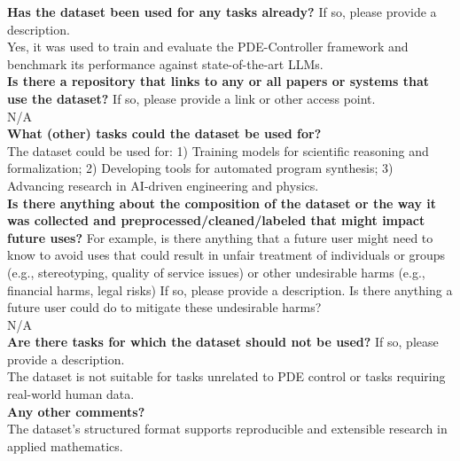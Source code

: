     \textcolor{\sectioncolor}{\textbf{Has the dataset been used for any tasks already?
    }
    If so, please provide a description.
    } \\
    Yes, it was used to train and evaluate the PDE-Controller framework and benchmark its performance against state-of-the-art LLMs. \\

    \textcolor{\sectioncolor}{\textbf{Is there a repository that links to any or all papers or systems that use the dataset?
    }
    If so, please provide a link or other access point.
    } \\
    N/A \\

    \textcolor{\sectioncolor}{\textbf{What (other) tasks could the dataset be used for?
    }
    } \\
    The dataset could be used for:
1) Training models for scientific reasoning and formalization;
2) Developing tools for automated program synthesis;
3) Advancing research in AI-driven engineering and physics. \\

    \textcolor{\sectioncolor}{\textbf{Is there anything about the composition of the dataset or the way it was
    collected and preprocessed/cleaned/labeled that might impact future uses?
    }
    For example, is there anything that a future user might need to know to
    avoid uses that could result in unfair treatment of individuals or groups
    (e.g., stereotyping, quality of service issues) or other undesirable harms
    (e.g., financial harms, legal risks) If so, please provide a description.
    Is there anything a future user could do to mitigate these undesirable
    harms?
    } \\
    N/A \\

    \textcolor{\sectioncolor}{\textbf{Are there tasks for which the dataset should not be used?
    }
    If so, please provide a description.
    } \\
    The dataset is not suitable for tasks unrelated to PDE control or tasks requiring real-world human data. \\

    \textcolor{\sectioncolor}{\textbf{Any other comments?
    }} \\
    The dataset's structured format supports reproducible and extensible research in applied mathematics. \\

